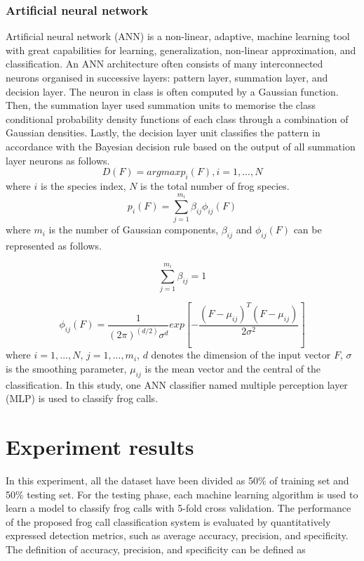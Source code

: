 \subsubsection{Artificial neural network}
Artificial neural network (ANN) is a non-linear, adaptive, machine learning tool with great capabilities for learning, generalization, non-linear approximation, and classification. An ANN architecture often consists of many interconnected neurons organised in successive layers: pattern layer, summation layer, and decision layer. The neuron in class is often computed by a Gaussian function. Then, the summation layer used summation units to memorise the class conditional probability density functions of each class through a combination of Gaussian densities. Lastly, the decision layer unit classifies the pattern in accordance with the Bayesian decision rule based on the output of all summation layer neurons as follows.
\begin{equation}
D(F)=argmax{p_{i}(F)}, i =1,...,N
\end{equation}
where $i$ is the species index, $N$ is the total number of frog species.
\begin{equation}
p_{i}(F)=\sum_{j=1}^{m_{i}}\beta_{ij}\phi_{ij}(F)
\end{equation}
where $m_{i}$ is the number of Gaussian components, $\beta_{ij}$ and $\phi_{ij}(F)$ can be represented as follows.

\begin{equation}
\sum_{j=1}^{m_{i}}\beta_{ij}=1
\end{equation}

\begin{equation}
\phi_{ij}(F)=\frac{1}{(2\pi)^(d/2)\sigma^{d}}exp[-\frac{(F-\mu_{ij})^{T}(F-\mu_{ij})}{2\sigma^2}]
\end{equation}
where $i=1,...,N$, $j=1,...,m_{i}$, $d$ denotes the dimension of the input vector $F$, $\sigma$ is the smoothing parameter, $\mu_{ij}$ is the mean vector and the central of the classification. In this study, one ANN classifier named multiple perception layer (MLP) is used to classify frog calls.

\section{Experiment results}
In this experiment, all the dataset have been divided as 50\% of training set and 50\% testing set. For the testing phase, each machine learning algorithm is used to learn a model to classify frog calls with 5-fold cross validation. The performance of the proposed frog call classification system is evaluated by quantitatively expressed detection metrics, such as average accuracy, precision, and specificity. The definition of accuracy, precision, and specificity can be defined as


